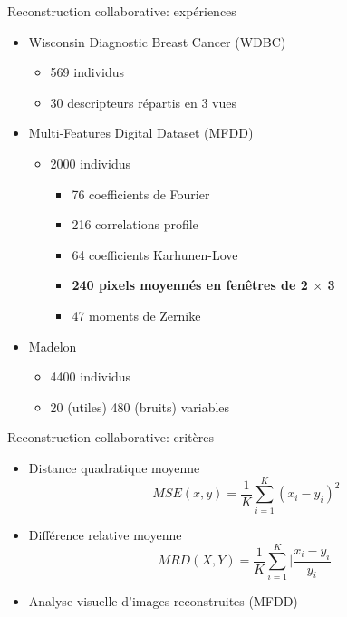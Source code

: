 \documentclass[hyperref={pdfpagelabels=false}]{beamer}
\begin{document}
    \begin{frame}{Reconstruction collaborative: expériences}
        \begin{itemize}
            \item Wisconsin Diagnostic Breast Cancer (WDBC)
                \begin{itemize}
                    \item 569 individus
                    \item 30 descripteurs répartis en 3 vues
                \end{itemize}
            \item Multi-Features Digital Dataset (MFDD)
                \begin{itemize}
                    \item 2000 individus
                    \begin{itemize}
                        \item 76 coefficients de Fourier
                        \item 216 correlations profile
                        \item 64 coefficients Karhunen-Love
                        \item\textbf{240 pixels moyennés en fenêtres de 2 
                            $\times$ 3}
                        \item 47 moments de Zernike
                    \end{itemize}
                \end{itemize}
            \item Madelon
                \begin{itemize}
                    \item 4400 individus
                    \item 20 (utiles) 480 (bruits) variables
                \end{itemize}
        \end{itemize}
    \end{frame}

    \begin{frame}{Reconstruction collaborative: critères}
        \begin{itemize}
            \item Distance quadratique moyenne
                \begin{equation*}
                    MSE(x, y) = \frac{1}{K}\sum_{i = 1}^{K}(x_i - y_i)^2
                \end{equation*}
            \item Différence relative moyenne
                \begin{equation*}
                    MRD(X, Y) = \frac{1}{K}\sum_{i=1}^{K}\Big|\frac{x_i - y_i}{y_i}\Big|
                \end{equation*}
            \item Analyse visuelle d'images reconstruites (MFDD)
        \end{itemize}
    \end{frame}
\end{document}
